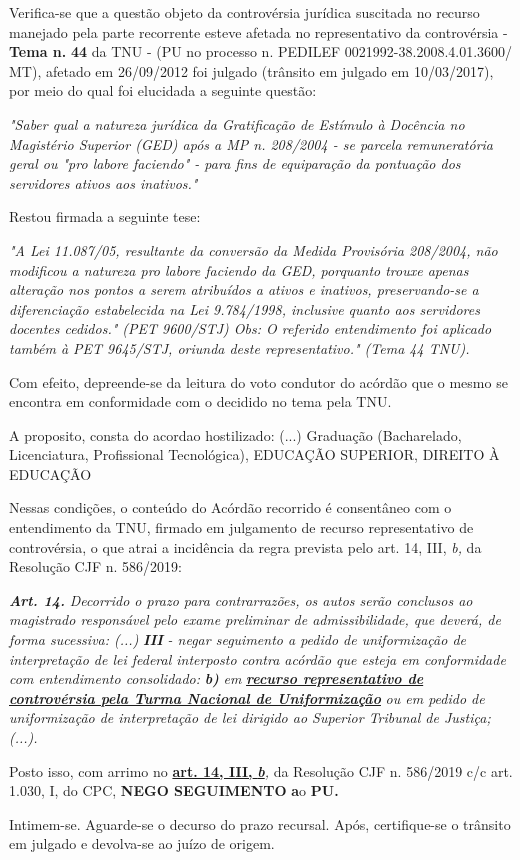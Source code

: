 \documentclass[12pt]{article}
\begin{document}
\justifying
\noindent Verifica-se que a questão objeto da controvérsia jurídica suscitada no recurso manejado pela parte recorrente esteve afetada no representativo da controvérsia - \textbf{Tema n. }\textbf{44} da TNU - (PU no processo n. PEDILEF 0021992-38.2008.4.01.3600/ MT),  afetado em 26/09/2012 foi julgado (trânsito em julgado em 10/03/2017), por meio do qual foi elucidada a seguinte questão:

\noindent \textit{"Saber qual a natureza jurídica da Gratificação de Estímulo à Docência no Magistério Superior (GED) após a MP n. 208/2004 - se parcela remuneratória geral ou "pro labore faciendo" - para fins de equiparação da pontuação dos servidores ativos aos inativos."}

\noindent Restou firmada a seguinte tese:

\noindent \textit{"A Lei 11.087/05, resultante da conversão da Medida Provisória 208/2004, não modificou a natureza pro labore faciendo da GED, porquanto trouxe apenas alteração nos pontos a serem atribuídos a ativos e inativos, preservando-se a diferenciação estabelecida na Lei 9.784/1998, inclusive quanto aos servidores docentes cedidos." (PET 9600/STJ) Obs: O referido entendimento foi aplicado também à PET 9645/STJ, oriunda deste representativo." (Tema 44 TNU).}

\noindent Com efeito, depreende-se da leitura do voto condutor do acórdão que o mesmo se encontra em conformidade com o decidido no  tema pela TNU.

\noindent A proposito, consta do acordao hostilizado: (...) Graduação (Bacharelado, Licenciatura, Profissional Tecnológica), EDUCAÇÃO SUPERIOR, DIREITO À EDUCAÇÃO

\noindent Nessas condições, o conteúdo do Acórdão recorrido é consentâneo com o entendimento da TNU, firmado em julgamento de recurso representativo de controvérsia, o que atrai a incidência da regra prevista pelo art. 14, III, \textit{b,} da Resolução CJF n. 586/2019:

\noindent \textit{\textbf{Art. 14.}}\textit{ Decorrido o prazo para contrarrazões, os autos serão conclusos ao magistrado responsável pelo exame preliminar de admissibilidade, que deverá, de forma sucessiva: (...) }\textit{\textbf{III }}\textit{- negar seguimento a pedido de uniformização de interpretação de lei federal interposto contra acórdão que esteja em conformidade com entendimento consolidado: }\textit{\textbf{b)}}\textit{ em }\uline{\textit{\textbf{recurso representativo de controvérsia pela Turma Nacional de Uniformização}}}\textit{ ou em pedido de uniformização de interpretação de lei dirigido ao Superior Tribunal de Justiça;(...).}

\noindent Posto isso, com arrimo no \uline{\textbf{art. 14, III, }}\uline{\textit{\textbf{b}}}\textit{,} da Resolução CJF n. 586/2019 c/c art. 1.030, I, do CPC, \textbf{NEGO SEGUIMENTO }\textbf{a}o\textbf{ PU}\textbf{.}

\noindent Intimem-se. Aguarde-se o decurso do prazo recursal. Após, certifique-se o trânsito em julgado e devolva-se ao juízo de origem.
\end{document}
